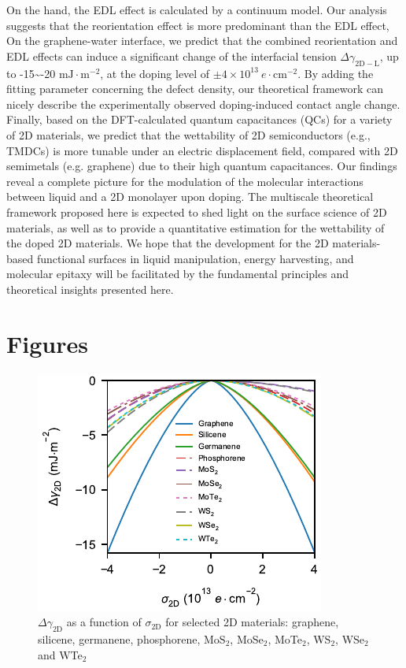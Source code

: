 \documentclass[journal=jacsat,manuscript=article,email=true]{achemso}
\begin{document}
On the hand, the EDL effect is calculated by a continuum model. Our
analysis suggests that the reorientation effect is more predominant
than the EDL effect, On the graphene-water interface, we predict that
the combined reorientation and EDL effects can induce a significant
change of the interfacial tension \(\Delta
\gamma_{\mathrm{2D-L}}\), up to -15\textasciitilde{}-20 \(\mathrm{mJ}\cdot
\mathrm{m}^{-2}\), at the doping level of \(\pm 4 \times 10^{13}\ e\cdot
\mathrm{cm}^{-2}\). By adding the fitting parameter concerning the
defect density, our theoretical framework can nicely describe the
experimentally observed doping-induced contact angle change. Finally,
based on the DFT-calculated quantum capacitances (QCs) for a variety
of 2D materials, we predict that the wettability of 2D semiconductors
(e.g., TMDCs) is more tunable under an electric displacement field,
compared with 2D semimetals (e.g. graphene) due to their high quantum
capacitances. Our findings reveal a complete picture for the
modulation of the molecular interactions between liquid and a 2D monolayer upon
doping. The multiscale theoretical
framework proposed here is expected to shed
light on the surface science of 2D materials, 
as well as to provide a quantitative estimation for the wettability
of the doped 2D materials. We hope that the development for the 2D
materials-based functional surfaces in liquid manipulation, energy
harvesting, and molecular epitaxy will be facilitated by the
fundamental principles and theoretical insights presented here.



\newpage{}
\section{Figures}
\label{sec:org0a7d2b4}

\begin{figure}[htbp]
\centering
\includegraphics[width=0.95\linewidth]{../img/dgamma-sigma.pdf}
\caption{\label{fig:dgamma-sigma}
\(\Delta \gamma_{\mathrm{2D}}\) as a function of \(\sigma_{\mathrm{2D}}\) for selected 2D materials: graphene, silicene, germanene, phosphorene, MoS\(_{2}\), MoSe\(_{2}\), MoTe\(_{2}\), WS\(_{2}\), WSe\(_{2}\) and WTe\(_{2}\)}
\end{figure}
\end{document}
